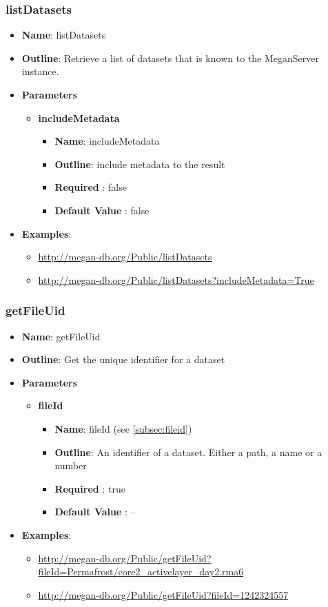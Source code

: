 \documentclass[11pt]{article}
\begin{document}
\subsubsection{listDatasets}
\begin{itemize}
	\item \textbf{Name}: listDatasets
	\item \textbf{Outline}: Retrieve a list of datasets that is known to the MeganServer instance.
	\item \textbf{Parameters}
		\begin{itemize}
			\item \textbf{includeMetadata}
				\begin{itemize}
					\item \textbf{Name}: includeMetadata
					\item \textbf{Outline}: include metadata to the result
					\item \textbf{Required} : false
					\item \textbf{Default Value} : false
				\end{itemize}
		\end{itemize}
	\item \textbf{Examples}:
		\begin{itemize}
			\item \url{http://megan-db.org/Public/listDatasets}
			\item \url{http://megan-db.org/Public/listDatasets?includeMetadata=True}
		\end{itemize}
\end{itemize}

\subsubsection{getFileUid}

\begin{itemize}
	\item \textbf{Name}: getFileUid
	\item \textbf{Outline}: Get the unique identifier for a dataset
	\item \textbf{Parameters}
		\begin{itemize}
			\item \textbf{fileId}
				\begin{itemize}
					\item \textbf{Name}: fileId (see \ref{subsec:fileid})
					\item \textbf{Outline}: An identifier of a dataset. Either a path, a name or a number
					\item \textbf{Required} : true
					\item \textbf{Default Value} : --
				\end{itemize}
		\end{itemize}
	\item \textbf{Examples}:
		\begin{itemize}
			\item \url{http://megan-db.org/Public/getFileUid?fileId=Permafrost/core2_activelayer_day2.rma6}
			\item \url{http://megan-db.org/Public/getFileUid?fileId=1242324557}
		\end{itemize}
\end{itemize}
\end{document}
